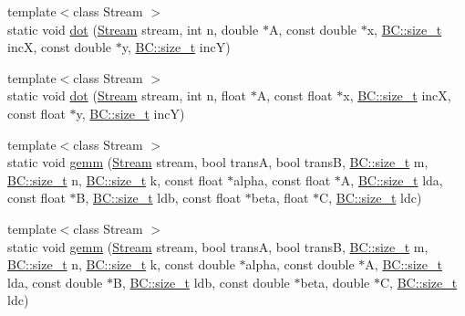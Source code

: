\begin{DoxyCompactItemize}
\item 
{\footnotesize template$<$class Stream $>$ }\\static void \hyperlink{structBC_1_1blas_1_1BLAS_3_01host__tag_01_4_a0ba27e9c462f784256dd42ff208ede52}{dot} (\hyperlink{namespaceBC_abc64a63cd29a22d102a68f478dfd588d}{Stream} stream, int n, double $\ast$A, const double $\ast$x, \hyperlink{namespaceBC_a6007cbc4eeec401a037b558910a56173}{B\+C\+::size\+\_\+t} incX, const double $\ast$y, \hyperlink{namespaceBC_a6007cbc4eeec401a037b558910a56173}{B\+C\+::size\+\_\+t} incY)
\item 
{\footnotesize template$<$class Stream $>$ }\\static void \hyperlink{structBC_1_1blas_1_1BLAS_3_01host__tag_01_4_aafdeace30eb396655a882f202c951483}{dot} (\hyperlink{namespaceBC_abc64a63cd29a22d102a68f478dfd588d}{Stream} stream, int n, float $\ast$A, const float $\ast$x, \hyperlink{namespaceBC_a6007cbc4eeec401a037b558910a56173}{B\+C\+::size\+\_\+t} incX, const float $\ast$y, \hyperlink{namespaceBC_a6007cbc4eeec401a037b558910a56173}{B\+C\+::size\+\_\+t} incY)
\item 
{\footnotesize template$<$class Stream $>$ }\\static void \hyperlink{structBC_1_1blas_1_1BLAS_3_01host__tag_01_4_a2d2c8e9d73703e339c1ca69342c4a1f6}{gemm} (\hyperlink{namespaceBC_abc64a63cd29a22d102a68f478dfd588d}{Stream} stream, bool transA, bool transB, \hyperlink{namespaceBC_a6007cbc4eeec401a037b558910a56173}{B\+C\+::size\+\_\+t} m, \hyperlink{namespaceBC_a6007cbc4eeec401a037b558910a56173}{B\+C\+::size\+\_\+t} n, \hyperlink{namespaceBC_a6007cbc4eeec401a037b558910a56173}{B\+C\+::size\+\_\+t} k, const float $\ast$alpha, const float $\ast$A, \hyperlink{namespaceBC_a6007cbc4eeec401a037b558910a56173}{B\+C\+::size\+\_\+t} lda, const float $\ast$B, \hyperlink{namespaceBC_a6007cbc4eeec401a037b558910a56173}{B\+C\+::size\+\_\+t} ldb, const float $\ast$beta, float $\ast$C, \hyperlink{namespaceBC_a6007cbc4eeec401a037b558910a56173}{B\+C\+::size\+\_\+t} ldc)
\item 
{\footnotesize template$<$class Stream $>$ }\\static void \hyperlink{structBC_1_1blas_1_1BLAS_3_01host__tag_01_4_afb07b50637a005dbd0c44a85648852a1}{gemm} (\hyperlink{namespaceBC_abc64a63cd29a22d102a68f478dfd588d}{Stream} stream, bool transA, bool transB, \hyperlink{namespaceBC_a6007cbc4eeec401a037b558910a56173}{B\+C\+::size\+\_\+t} m, \hyperlink{namespaceBC_a6007cbc4eeec401a037b558910a56173}{B\+C\+::size\+\_\+t} n, \hyperlink{namespaceBC_a6007cbc4eeec401a037b558910a56173}{B\+C\+::size\+\_\+t} k, const double $\ast$alpha, const double $\ast$A, \hyperlink{namespaceBC_a6007cbc4eeec401a037b558910a56173}{B\+C\+::size\+\_\+t} lda, const double $\ast$B, \hyperlink{namespaceBC_a6007cbc4eeec401a037b558910a56173}{B\+C\+::size\+\_\+t} ldb, const double $\ast$beta, double $\ast$C, \hyperlink{namespaceBC_a6007cbc4eeec401a037b558910a56173}{B\+C\+::size\+\_\+t} ldc)

\end{DoxyCompactItemize}
